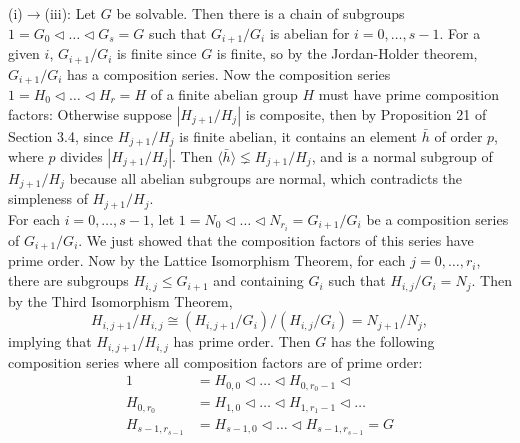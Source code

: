 \documentclass{article}
\begin{document}
\begin{enumerate}
    (i)$\rightarrow$(iii): Let $G$ be solvable. Then there is a chain of
    subgroups $1=G_0\triangleleft\ldots\triangleleft G_s=G$ such that
    $G_{i+1}/G_i$ is abelian for $i=0,\ldots,s-1$. For a given $i$,
    $G_{i+1}/G_i$ is finite since $G$ is finite, so by the Jordan-Holder
    theorem, $G_{i+1}/G_i$ has a composition series. Now the composition
    series $1=H_0\triangleleft\ldots\triangleleft H_r=H$ of a finite
    abelian group $H$ must have prime composition factors: Otherwise
    suppose $|H_{j+1}/H_j|$ is composite, then by Proposition 21 of Section
    3.4, since $H_{j+1}/H_j$ is finite abelian, it contains an element
    $\bar{h}$ of order $p$, where $p$ divides $|H_{j+1}/H_j|$. Then
    $\langle\bar{h}\rangle\lneq H_{j+1}/H_j$, and is a normal subgroup of
    $H_{j+1}/H_j$ because all abelian subgroups are normal, which
    contradicts the simpleness of $H_{j+1}/H_j$. \\

    For each $i=0,\ldots,s-1$, let $1=N_0\triangleleft\ldots\triangleleft
    N_{r_i}=G_{i+1}/G_i$ be a composition series of $G_{i+1}/G_i$. We just
    showed that the composition factors of this series have prime order.
    Now by the Lattice Isomorphism Theorem, for each $j=0,\ldots,r_i$,
    there are subgroups $H_{i,j}\leq G_{i+1}$ and containing $G_i$ such that
    $H_{i,j}/G_i=N_j$. Then by the Third Isomorphism Theorem,
    \begin{equation*}
      H_{i,j+1}/H_{i,j} \cong (H_{i,j+1}/G_i)/(H_{i,j}/G_i) = N_{j+1}/N_j,
    \end{equation*}
    implying that $H_{i,j+1}/H_{i,j}$ has prime order. Then $G$ has the
    following composition series where all composition factors are of prime
    order:
    \begin{align*}
      1         &=H_{0,0}\triangleleft\ldots\triangleleft
                  H_{0,r_0-1}\triangleleft  \\
      H_{0,r_0} &=H_{1,0}\triangleleft\ldots\triangleleft
                  H_{1,r_1-1}\triangleleft\ldots  \\
      H_{s-1,r_{s-1}} &=H_{s-1,0}\triangleleft\ldots\triangleleft
                  H_{s-1,r_{s-1}}=G \\
    \end{align*}


\end{enumerate}
\end{document}

